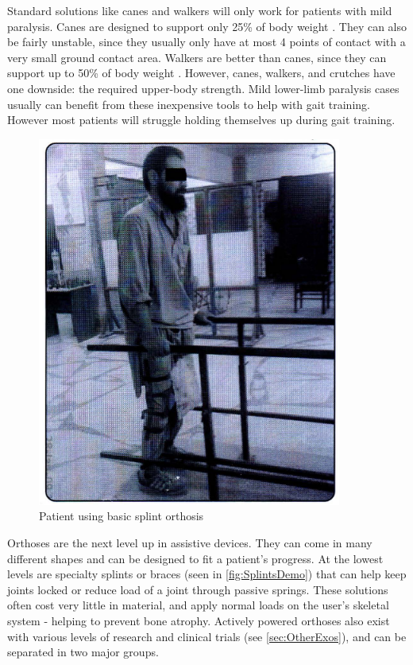 Standard solutions like canes and walkers will only work for patients with mild paralysis. Canes are designed to support only 25\% of body weight \cite{RehabParaplegia}. They can also be fairly unstable, since they usually only have at most 4 points of contact with a very small ground contact area. Walkers are better than canes, since they can support up to 50\% of body weight \cite{RehabParaplegia}. However, canes, walkers, and crutches have one downside: the required upper-body strength. Mild lower-limb paralysis cases usually can benefit from these inexpensive tools to help with gait training. However most patients will struggle holding themselves up during gait training.

\begin{figure} [ht!]
    \centering
    \includegraphics[width=0.4\linewidth]{Figures/Background/SplintsDemo.png}
    \caption{Patient using basic splint orthosis \cite{RehabParaplegia}}
    \label{fig:SplintsDemo}
\end{figure}

Orthoses are the next level up in assistive devices. They can come in many different shapes and can be designed to fit a patient's progress. At the lowest levels are specialty splints or braces (seen in \autoref{fig:SplintsDemo}) that can help keep joints locked or reduce load of a joint through passive springs. These solutions often cost very little in material, and apply normal loads on the user's skeletal system - helping to prevent bone atrophy. Actively powered orthoses also exist with various levels of research and clinical trials (see \autoref{sec:OtherExos}), and can be separated in two major groups. 

